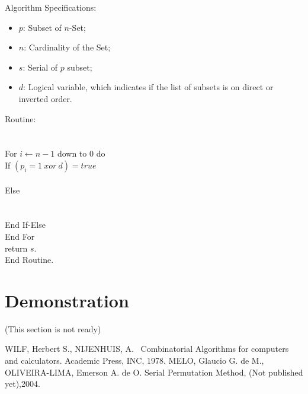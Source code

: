 \documentclass {amsart}
\begin{document}
Algorithm Specifications:
\begin{itemize}

\item {$p$}: Subset of {$n$}-Set;

\item {$n$}: Cardinality of the Set;

\item {$s$}: Serial of {$p$} subset;

\item {$d$}: Logical variable, which indicates if the list of
subsets is on direct or inverted order.

\end{itemize}
Routine:\\
\\
\\
\indent For {$i \leftarrow n-1$} down to {$0$} do\\
\indent \indent If {$(p_i = 1 ~xor~ d) = true$}\\
\indent \indent {}\\
\indent \indent Else\\
\indent \indent {}\\
\indent \indent {}\\
\indent \indent End If-Else\\
\indent End For\\
return {$s$}.\\
End Routine.

\section*{Demonstration}
(This section is not ready)

\begin{thebibliography}{99}
 WILF, Herbert S., NIJENHUIS, A.
~Combinatorial Algorithms for computers and calculators. Academic
Press, INC, 1978.
 MELO, Glaucio G. de M.,
OLIVEIRA-LIMA, Emerson A. de O. Serial Permutation Method, (Not
published yet),2004.
\end{thebibliography}
\end{document}
